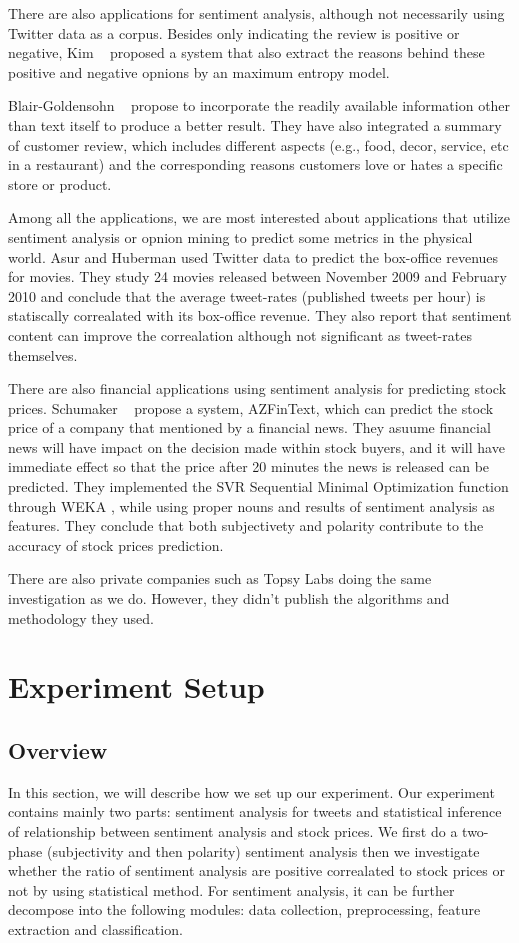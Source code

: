 \documentclass[12pt]{article}
\begin{document}
There are also applications for sentiment analysis, although not necessarily using Twitter data as a corpus. Besides only indicating the review is positive or negative, Kim \etal~\cite{Kim:06} proposed a system that also extract the reasons behind these positive and negative opnions by an maximum entropy model.

Blair-Goldensohn \etal~\cite{Blair:08} propose to incorporate the readily available information other than text itself to produce a better result. They have also integrated a summary of customer review, which includes different aspects (e.g., food, decor, service, etc in a restaurant) and the corresponding reasons customers love or hates a specific store or product.

Among all the applications, we are most interested about applications that utilize sentiment analysis or opnion mining to predict some metrics in the physical world. Asur and Huberman \cite{Asur:10} used Twitter data to predict the box-office revenues for movies. They study 24 movies released between November 2009 and February 2010 and conclude that the average tweet-rates (published tweets per hour) is statiscally correalated with its box-office revenue. They also report that sentiment content can improve the correalation although not significant as tweet-rates themselves.

There are also financial applications using sentiment analysis for predicting stock prices. Schumaker \etal~\cite{Schumaker:2009} propose a system, AZFinText, which can predict the stock price of a company that mentioned by a financial news. They asuume financial news will have impact on the decision made within stock buyers, and it will have immediate effect so that the price after 20 minutes the news is released can be predicted. They implemented the SVR Sequential Minimal Optimization function through WEKA \cite{Witten:2005}, while using proper nouns and results of sentiment analysis as features. They conclude that both subjectivety and polarity contribute to the accuracy of stock prices prediction.

There are also private companies such as Topsy Labs \cite{Topsy} doing the same investigation as we do. However, they didn't publish the algorithms and methodology they used.

\section{Experiment Setup}
\subsection{Overview}
In this section, we will describe how we set up our experiment. Our experiment contains mainly two parts: sentiment analysis for tweets and statistical inference of relationship between sentiment analysis and stock prices. We first do a two-phase (subjectivity and then polarity) sentiment analysis then we investigate whether the ratio of sentiment analysis are positive correalated to stock prices or not by using statistical method. For sentiment analysis, it can be further decompose into the following modules: data collection, preprocessing, feature extraction and classification. 
\end{document}
